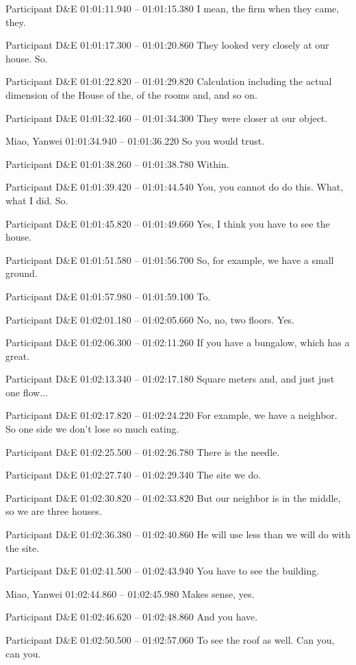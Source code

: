 {Participant D\&E 01:01:11.940 -- 01:01:15.380
I mean, the firm when they came, they.

Participant D\&E 01:01:17.300 -- 01:01:20.860
They looked very closely at our house. So.

Participant D\&E 01:01:22.820 -- 01:01:29.820
Calculation including the actual dimension of the House of the, of the rooms and, and so on.

Participant D\&E 01:01:32.460 -- 01:01:34.300
They were closer at our object.

Miao, Yanwei 01:01:34.940 -- 01:01:36.220
So you would trust.

Participant D\&E 01:01:38.260 -- 01:01:38.780
Within.

Participant D\&E 01:01:39.420 -- 01:01:44.540
You, you cannot do do this. What, what I did. So.

Participant D\&E 01:01:45.820 -- 01:01:49.660
Yes, I think you have to see the house.

Participant D\&E 01:01:51.580 -- 01:01:56.700
So, for example, we have a small ground.

Participant D\&E 01:01:57.980 -- 01:01:59.100
To.

Participant D\&E 01:02:01.180 -- 01:02:05.660
No, no, two floors. Yes.

Participant D\&E 01:02:06.300 -- 01:02:11.260
If you have a bungalow, which has a great.

Participant D\&E 01:02:13.340 -- 01:02:17.180
Square meters and, and just just one flow...

Participant D\&E 01:02:17.820 -- 01:02:24.220
For example, we have a neighbor. So one side we don't lose so much eating.

Participant D\&E 01:02:25.500 -- 01:02:26.780
There is the needle.

Participant D\&E 01:02:27.740 -- 01:02:29.340
The site we do.

Participant D\&E 01:02:30.820 -- 01:02:33.820
But our neighbor is in the middle, so we are three houses.

Participant D\&E 01:02:36.380 -- 01:02:40.860
He will use less than we will do with the site.

Participant D\&E 01:02:41.500 -- 01:02:43.940
You have to see the building.

Miao, Yanwei 01:02:44.860 -- 01:02:45.980
Makes sense, yes.

Participant D\&E 01:02:46.620 -- 01:02:48.860
And you have.

Participant D\&E 01:02:50.500 -- 01:02:57.060
To see the roof as well. Can you, can you.

}
